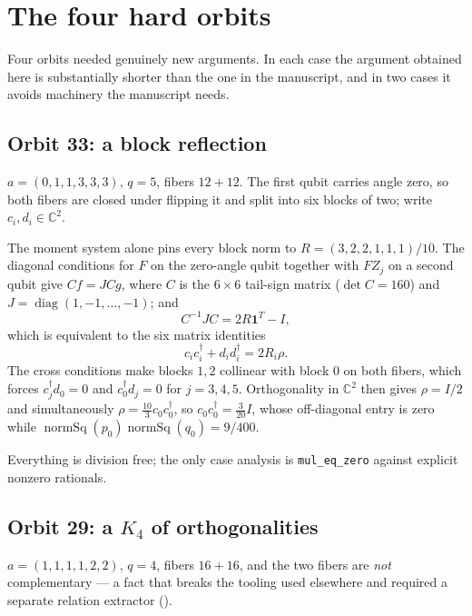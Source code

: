 \documentclass[11pt,a4paper]{article}
\newcommand{\CC}{\mathbb{C}}
\newcommand{\lean}[1]{\texttt{#1}}
\theoremstyle{definition}
\begin{document}
\section{The four hard orbits}

Four orbits needed genuinely new arguments. In each case the argument obtained
here is substantially shorter than the one in the manuscript, and in two cases it
avoids machinery the manuscript needs.

\subsection{Orbit 33: a block reflection}

$a = (0,1,1,3,3,3)$, $q = 5$, fibers $12 + 12$. The first qubit carries angle
zero, so both fibers are closed under flipping it and split into six blocks of
two; write $c_i, d_i \in \CC^2$.

The moment system alone pins every block norm to $R = (3,2,2,1,1,1)/10$. The
diagonal conditions for $F$ on the zero-angle qubit together with $F Z_j$ on a
second qubit give $C f = J C g$, where $C$ is the $6 \times 6$ tail-sign matrix
($\det C = 160$) and $J = \operatorname{diag}(1,-1,\dots,-1)$; and
\[
  C^{-1} J C = 2 R \mathbf{1}^T - I,
\]
which is equivalent to the six matrix identities
\[
  c_i c_i^\dagger + d_i d_i^\dagger = 2 R_i \rho .
\]
The cross conditions make blocks $1,2$ collinear with block $0$ on both fibers,
which forces $c_j^\dagger d_0 = 0$ and $c_0^\dagger d_j = 0$ for $j = 3,4,5$.
Orthogonality in $\CC^2$ then gives $\rho = I/2$ and simultaneously
$\rho = \tfrac{10}{3} c_0 c_0^\dagger$, so $c_0 c_0^\dagger = \tfrac{3}{20} I$,
whose off-diagonal entry is zero while
$\operatorname{normSq}(p_0)\operatorname{normSq}(q_0) = 9/400$.

Everything is division free; the only case analysis is \lean{mul\_eq\_zero}
against explicit nonzero rationals.

\subsection{Orbit 29: a \texorpdfstring{$K_4$}{K4} of orthogonalities}

$a = (1,1,1,1,2,2)$, $q = 4$, fibers $16 + 16$, and the two fibers are
\emph{not} complementary --- a fact that breaks the tooling used elsewhere and
required a separate relation extractor ().
\end{document}
